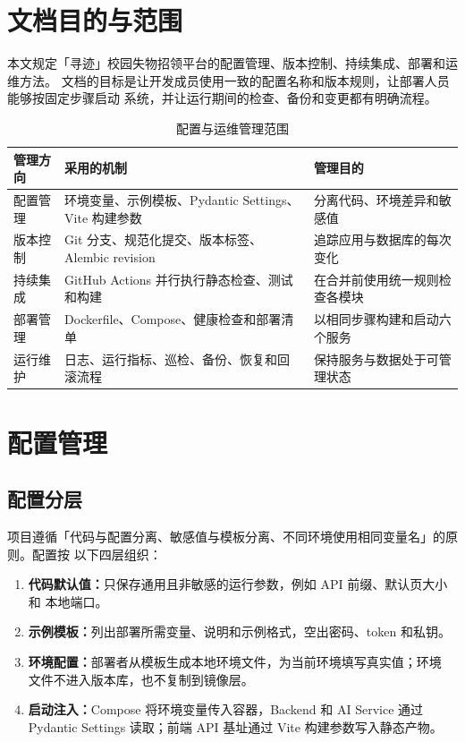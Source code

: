 \section{文档目的与范围}

本文规定「寻迹」校园失物招领平台的配置管理、版本控制、持续集成、部署和运维方法。
文档的目标是让开发成员使用一致的配置名称和版本规则，让部署人员能够按固定步骤启动
系统，并让运行期间的检查、备份和变更都有明确流程。

\begin{table}[H]
  \centering
  \caption{配置与运维管理范围}
  \begin{tabularx}{\textwidth}{L{3.0cm}L{4.1cm}Y}
    \toprule
    管理方向 & 采用的机制 & 管理目的 \\
    \midrule
    配置管理 & 环境变量、示例模板、Pydantic Settings、Vite 构建参数 & 分离代码、环境差异和敏感值 \\
    版本控制 & Git 分支、规范化提交、版本标签、Alembic revision & 追踪应用与数据库的每次变化 \\
    持续集成 & GitHub Actions 并行执行静态检查、测试和构建 & 在合并前使用统一规则检查各模块 \\
    部署管理 & Dockerfile、Compose、健康检查和部署清单 & 以相同步骤构建和启动六个服务 \\
    运行维护 & 日志、运行指标、巡检、备份、恢复和回滚流程 & 保持服务与数据处于可管理状态 \\
    \bottomrule
  \end{tabularx}
\end{table}

\section{配置管理}

\subsection{配置分层}

项目遵循「代码与配置分离、敏感值与模板分离、不同环境使用相同变量名」的原则。配置按
以下四层组织：

\begin{enumerate}
  \item \textbf{代码默认值：}只保存通用且非敏感的运行参数，例如 API 前缀、默认页大小和
  本地端口。
  \item \textbf{示例模板：}列出部署所需变量、说明和示例格式，空出密码、token 和私钥。
  \item \textbf{环境配置：}部署者从模板生成本地环境文件，为当前环境填写真实值；环境
  文件不进入版本库，也不复制到镜像层。
  \item \textbf{启动注入：}Compose 将环境变量传入容器，Backend 和 AI Service 通过
  Pydantic Settings 读取；前端 API 基址通过 Vite 构建参数写入静态产物。
\end{enumerate}


